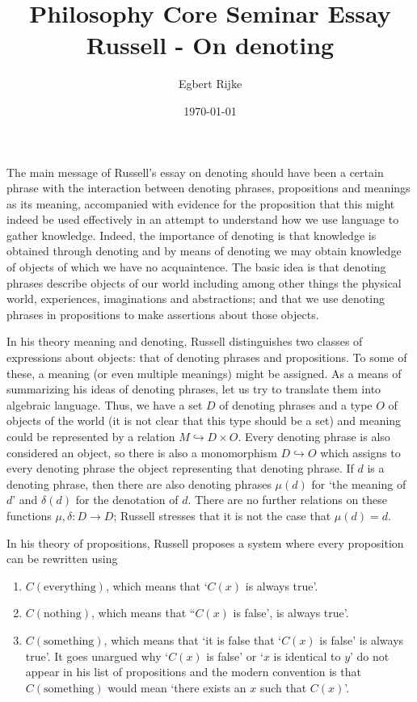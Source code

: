 \documentclass{article}
\title{{\sc Philosophy Core Seminar Essay}\\ Russell - On denoting}
\author{Egbert Rijke}
\date\today
\begin{document}
\maketitle

The main message of Russell's essay on denoting should have been a certain
phrase with the interaction between denoting phrases, propositions and meanings
as its meaning, accompanied with evidence for the proposition that this might
indeed be used effectively in an attempt to understand how we use language to 
gather knowledge. Indeed, the importance of denoting is that knowledge
is obtained through denoting and by means of denoting we may obtain knowledge
of objects of which we have no acquaintence. The basic idea is that denoting
phrases describe objects of our world including among other things the physical 
world, experiences, imaginations and abstractions; and that we use denoting 
phrases in propositions to make assertions about those objects.

In his theory meaning and denoting, Russell distinguishes two classes of
expressions about objects: that of denoting phrases and
propositions. To some of these, a meaning (or even multiple meanings) might be
assigned. As a means of summarizing his ideas of denoting phrases, let us try
to translate them into algebraic language. Thus, we have a set $D$ of denoting
phrases and a type $O$ of objects of the world (it is not clear that this type
should be a set) and meaning could be represented by a relation 
$M\hookrightarrow D\times O$. Every denoting phrase is also considered an
object, so there is also a monomorphism $D \hookrightarrow O$ which assigns to
every denoting phrase the object representing that denoting phrase. If $d$ is
a denoting phrase, then there are also denoting phrases $\mu(d)$ for `the meaning
of $d$' and $\delta(d)$ for the denotation of $d$. There are no further relations
on these functions $\mu,\delta:D\to D$; Russell stresses that it is not the case
that $\mu(d)=d$. 

In his theory of propositions, Russell proposes a system where every
proposition can be rewritten using
\begin{enumerate}
\item $C(\text{everything})$, which means that `$C(x)$ is always true'.
\item $C(\text{nothing})$, which means that ``$C(x)$ is false', is always true'.
\item $C(\text{something})$, which means that `it is false that `$C(x)$ is
false' is always true'. It goes unargued why `$C(x)$ is false' or `$x$ is
identical to $y$' do not appear in his list of propositions and the modern
convention is that $C(\text{something})$ would mean `there exists an $x$ such
that $C(x)$'. 
\end{enumerate}
\end{document}

